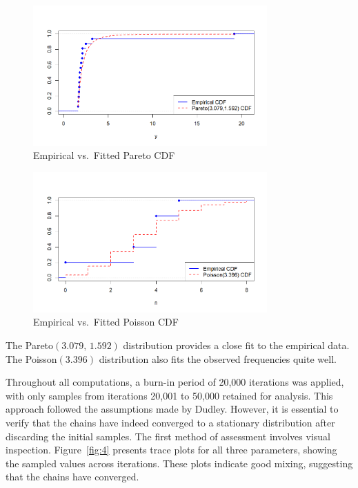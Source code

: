\documentclass{Class/julia}
\begin{document}
\begin{figure}[!ht]
    \centering
    \includegraphics[width=0.8\textwidth]{rytgaard1990/empirical_vs_pareto.png}
    \caption{Empirical vs.\ Fitted Pareto CDF}
    \label{fig:2}
\end{figure}

\begin{figure}[!ht]
    \centering
    \includegraphics[width=0.8\textwidth]{rytgaard1990/empirical_vs_poisson.png}
    \caption{Empirical vs.\ Fitted Poisson CDF}
    \label{fig:3}
\end{figure}

The Pareto\((3.079,\,1.592)\) distribution provides a close fit to the empirical data. The Poisson\((3.396)\) distribution also fits the observed frequencies quite well.

Throughout all computations, a burn-in period of 20{,}000 iterations was applied, with only samples from iterations 20{,}001 to 50{,}000 retained for analysis. This approach followed the assumptions made by Dudley. However, it is essential to verify that the chains have indeed converged to a stationary distribution after discarding the initial samples. The first method of assessment involves visual inspection. Figure~\ref{fig:4} presents trace plots for all three parameters, showing the sampled values across iterations. These plots indicate good mixing, suggesting that the chains have converged.
\end{document}
